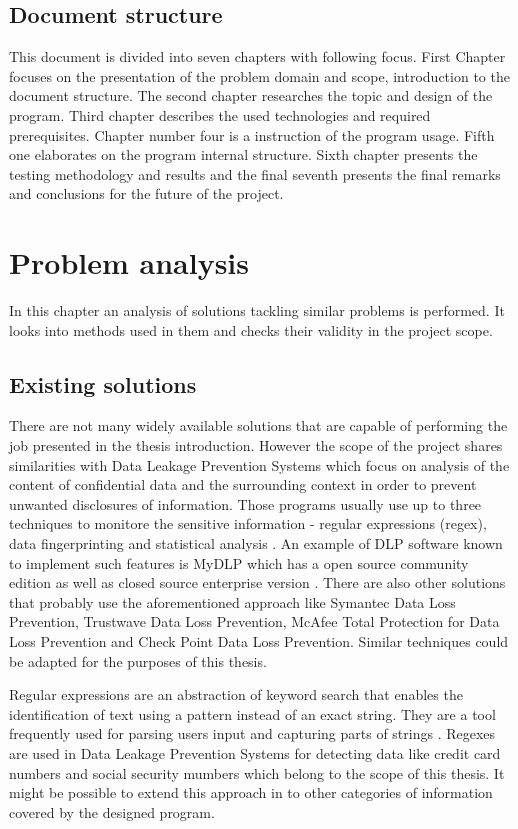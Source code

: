 \documentclass[a4paper,twoside,12pt]{book}
\begin{document}
\section{Document structure}

This document is divided into seven chapters with following focus. First Chapter focuses on the presentation of the problem domain and scope, introduction to the document structure. 
The second chapter researches the topic and design of the program. Third chapter describes the used technologies and required prerequisites. Chapter number four is a instruction of the program usage.
Fifth one elaborates on the program internal structure. Sixth chapter presents the testing methodology and results and the final seventh presents the final remarks and conclusions for the future of the project.

\chapter{Problem analysis}

In this chapter an analysis of solutions tackling similar problems is performed. It looks into methods used in them and checks their validity in the project scope.

\section{Existing solutions}

There are not many widely available solutions that are capable of performing the job presented in the thesis introduction. However the scope of the project shares
similarities with Data Leakage Prevention Systems which focus on analysis of the content of confidential data and the surrounding context in order to
prevent unwanted disclosures of information. Those programs usually use up to three techniques to monitore the sensitive information - regular expressions (regex),
data fingerprinting and statistical analysis \cite{bib:articleDLPS}. An example of DLP software known to implement such features is MyDLP which has a open source
community edition as well as closed source enterprise version \cite{bib:internetDLP}. There are also other solutions that probably use the aforementioned approach 
like Symantec Data Loss Prevention, Trustwave Data Loss Prevention, McAfee Total Protection for Data Loss Prevention and Check Point Data Loss Prevention.
Similar techniques could be adapted for the purposes of this thesis. 

Regular expressions are an abstraction of keyword search that enables the identification of text using a pattern instead of an exact string. They are a tool 
frequently used for parsing users input and capturing parts of strings \cite{bib:conferenceRegex}. Regexes are used in Data Leakage Prevention Systems for detecting 
data like credit card numbers and social security mumbers \cite{bib:articleDLPS} which belong to the scope of this thesis. It might be possible to extend this approach 
in to other categories of information covered by the designed program.
\end{document}
